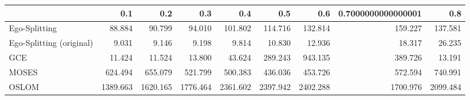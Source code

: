 \begin{tabular}{lrrrrrrrr}
\toprule
{} &      0.1 &      0.2 &      0.3 &      0.4 &      0.5 &      0.6 & 0.7000000000000001 &      0.8 \\
\midrule
Ego-Splitting            &   88.884 &   90.799 &   94.010 &  101.802 &  114.716 &  132.814 &            159.227 &  137.581 \\
Ego-Splitting (original) &    9.031 &    9.146 &    9.198 &    9.814 &   10.830 &   12.936 &             18.317 &   26.235 \\
GCE                      &   11.424 &   11.524 &   13.800 &   43.624 &  289.243 &  943.135 &            389.726 &   13.191 \\
MOSES                    &  624.494 &  655.079 &  521.799 &  500.383 &  436.036 &  453.726 &            572.594 &  740.991 \\
OSLOM                    & 1389.663 & 1620.165 & 1776.464 & 2361.602 & 2397.942 & 2402.288 &           1700.976 & 2099.484 \\
\bottomrule
\end{tabular}
